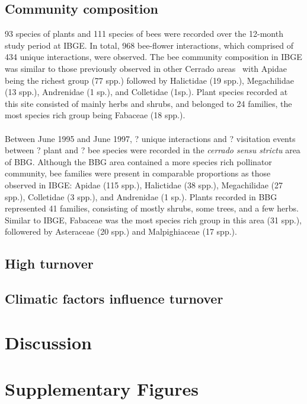 \documentclass[11pt]{article}
\begin{document}
\subsection{Community composition}
93 species of plants and 111 species of bees were recorded over the 12-month study period at IBGE. In total, 968 bee-flower interactions, which comprised of 434 unique interactions, were observed. The bee community composition in IBGE was similar to those previously observed in other Cerrado areas~\citep{Silveira1995, Pinheiro-Machado2002} with Apidae being the richest group (77 spp.) followed by Halictidae (19 spp.), Megachilidae (13 spp.), Andrenidae (1 sp.), and Colletidae (1sp.). Plant species recorded at this site consisted of mainly herbs and shrubs, and belonged to 24 families, the most species rich group being Fabaceae (18 spp.). \\
\\
Between June 1995 and June 1997, ? unique interactions and ? visitation events between ? plant and ? bee species were recorded in the \textit{cerrado sensu strictu} area of BBG. Although the BBG area contained a more species rich pollinator community, bee families were present in comparable proportions as those observed in IBGE: Apidae (115 spp.), Halictidae (38 spp.), Megachilidae (27 spp.), Colletidae (3 spp.), and Andrenidae (1 sp.). Plants recorded in BBG represented 41 families, consisting of mostly shrubs, some trees, and a few herbs. Similar to IBGE, Fabaceae was the most species rich group in this area (31 spp.), followered by Asteraceae (20 spp.) and Malpighiaceae (17 spp.). 

\subsection{High turnover}
\subsection{Climatic factors influence turnover}

\newpage
\section{Discussion} 


\newpage



\section{Supplementary Figures}

\end{document}
